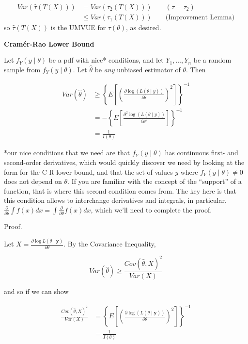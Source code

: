 \documentclass[
  letterpaper,
  DIV=11,
  numbers=noendperiod]{scrreprt}
\begin{document}
\begin{align*}
    Var(\hat{\tau}(T(X))) & = Var(\tau_2(T(X))) \quad \quad (\hat{\tau} = \tau_2) \\
    & \leq Var(\tau_1(T(X))) \quad \quad \text{(Improvement Lemma)}
\end{align*} so \(\hat{\tau}(T(X))\) is the UMVUE for \(\tau(\theta)\),
as desired.

\textbf{Cramér-Rao Lower Bound}

Let \(f_Y(y \mid \theta)\) be a pdf with nice* conditions, and let
\(Y_1, \dots, Y_n\) be a random sample from \(f_Y(y \mid \theta)\). Let
\(\hat{\theta}\) be \emph{any} unbiased estimator of \(\theta\). Then

\begin{align*} 
Var(\hat{\theta}) & \geq \left\{ E\left[ \left( \frac{\partial \log( L(\theta \mid y))}{\partial \theta}\right)^2\right]\right\}^{-1} \\
& = -\left\{ E\left[ \frac{\partial^2 \log( L(\theta \mid y))}{\partial \theta^2} \right] \right\}^{-1} \\
& = \frac{1}{I(\theta)}
\end{align*}

*our nice conditions that we need are that \(f_Y(y \mid \theta)\) has
continuous first- and second-order derivatives, which would quickly
discover we need by looking at the form for the C-R lower bound, and
that the set of values \(y\) where \(f_Y(y \mid \theta) \neq 0\) does
not depend on \(\theta\). If you are familiar with the concept of the
``support'' of a function, that is where this second condition comes
from. The key here is that this condition allows to interchange
derivatives and integrals, in particular,
\(\frac{\partial}{\partial \theta} \int f(x) dx = \int \frac{\partial}{\partial \theta} f(x)dx\),
which we'll need to complete the proof.

Proof.

Let
\(X = \frac{\partial \log L(\theta \mid \textbf{y})}{\partial \theta}\).
By the Covariance Inequality,

\[
Var(\hat{\theta}) \geq \frac{Cov(\hat{\theta},X)^2}{Var(X)}
\]

and so if we can show

\begin{align*} 
\frac{Cov(\hat{\theta},X)^2}{Var(X)} & = \left\{ E\left[ \left( \frac{\partial \log( L(\theta \mid \textbf{y}))}{\partial \theta}\right)^2\right]\right\}^{-1}  \\
& = \frac{1}{I(\theta)}
\end{align*}
\end{document}
